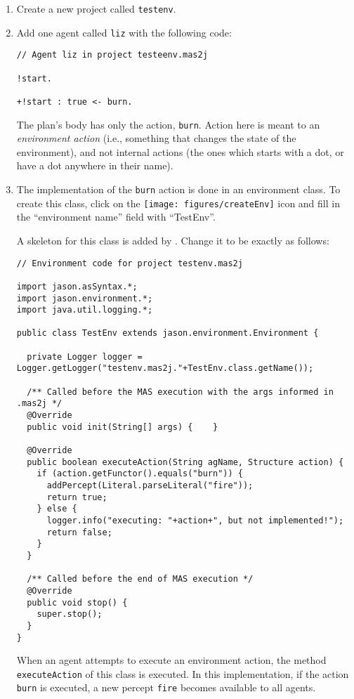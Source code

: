 \documentclass[a4paper]{article}
\newcommand{\Jason}[0]{\htlink{\textit{\textbf{Jason}}}{http://jason.sf.net}\xspace}
\begin{document}
\begin{enumerate}
\item Create a new project called \texttt{testenv}.
\item Add one agent called \texttt{liz} with the following code:
\begin{verbatim}
// Agent liz in project testeenv.mas2j

!start.

+!start : true <- burn.
\end{verbatim}

  The plan's body has only the action, \texttt{burn}. Action here is
  meant to an \emph{environment action} (i.e., something that changes
  the state of the environment), and not internal actions (the ones
  which starts with a dot, or have a dot anywhere in their name).

\item The implementation of the \texttt{burn} action is done in an environment
  class. To create this class, click on the
  \texttt{[image: figures/createEnv]} icon and fill in the ``environment name''
  field with ``TestEnv''.  

  A skeleton for this class is added by \Jason. Change it to be
  exactly as follows:
\begin{verbatim}
// Environment code for project testenv.mas2j

import jason.asSyntax.*;
import jason.environment.*;
import java.util.logging.*;

public class TestEnv extends jason.environment.Environment {

  private Logger logger = Logger.getLogger("testenv.mas2j."+TestEnv.class.getName());

  /** Called before the MAS execution with the args informed in .mas2j */
  @Override
  public void init(String[] args) {    }

  @Override
  public boolean executeAction(String agName, Structure action) {
    if (action.getFunctor().equals("burn")) {
      addPercept(Literal.parseLiteral("fire"));
      return true;
    } else {
      logger.info("executing: "+action+", but not implemented!");
      return false;
    }
  }

  /** Called before the end of MAS execution */
  @Override
  public void stop() {
    super.stop();
  }
}
\end{verbatim}

  When an agent attempts to execute an environment action, the method
  \texttt{executeAction} of this class is executed. In this
  implementation, if the action \texttt{burn} is executed, a new
  percept \texttt{fire} becomes available to all agents.


\end{enumerate}
\end{document}
